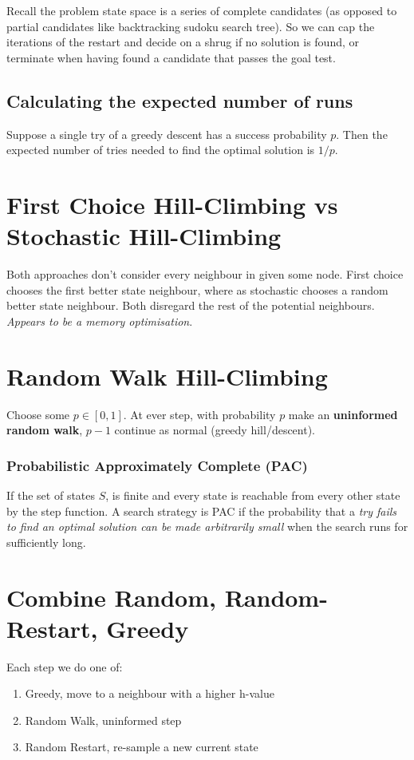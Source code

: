 \documentclass{article}
\begin{document}
Recall the problem state space is a series of complete candidates (as opposed to partial candidates like backtracking sudoku search tree). So we can cap the iterations of the restart and decide on a shrug if no solution is found, or terminate when having found a candidate that passes the goal test.

\subsection*{Calculating the expected number of runs}
Suppose a single try of a greedy descent has a success probability $p$. Then the expected number of tries needed to find the optimal solution is $1/p$.

\section{First Choice Hill-Climbing vs Stochastic Hill-Climbing}
Both approaches don't consider every neighbour in given some node. First choice chooses the first better state neighbour, where as stochastic chooses a random better state neighbour. Both disregard the rest of the potential neighbours. \emph{Appears to be a memory optimisation}.

\section{Random Walk Hill-Climbing}
Choose some $p \in [0,1]$. At ever step, with probability $p$ make an \textbf{uninformed random walk}, $p-1$ continue as normal (greedy hill/descent).

\subsubsection{Probabilistic Approximately Complete (PAC)}
If the set of states $S$, is finite and every state is reachable from every other state by the step function. A search strategy is PAC if the probability that a \emph{try fails to find an optimal solution can be made arbitrarily small} when the search runs for sufficiently long.

\section{Combine Random, Random-Restart, Greedy}
Each step we do one of:
\begin{enumerate}
	\item Greedy, move to a neighbour with a higher h-value
	\item Random Walk, uninformed step
	\item Random Restart, re-sample a new current state
\end{enumerate}
\end{document}
